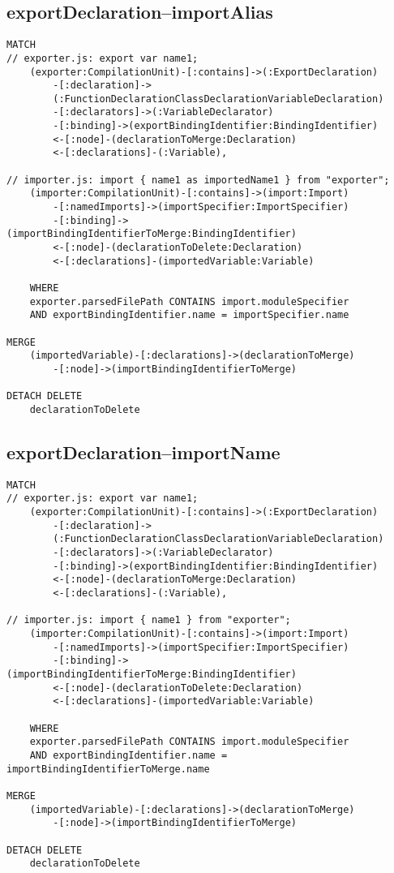 \newpage
\subsection{exportDeclaration–importAlias}
\begin{lstlisting}[language=Cypher]
MATCH
// exporter.js: export var name1;
    (exporter:CompilationUnit)-[:contains]->(:ExportDeclaration)
        -[:declaration]->
        (:FunctionDeclarationClassDeclarationVariableDeclaration)
        -[:declarators]->(:VariableDeclarator)
        -[:binding]->(exportBindingIdentifier:BindingIdentifier)
        <-[:node]-(declarationToMerge:Declaration)
        <-[:declarations]-(:Variable),

// importer.js: import { name1 as importedName1 } from "exporter";
    (importer:CompilationUnit)-[:contains]->(import:Import)
        -[:namedImports]->(importSpecifier:ImportSpecifier)
        -[:binding]->(importBindingIdentifierToMerge:BindingIdentifier)
        <-[:node]-(declarationToDelete:Declaration)
        <-[:declarations]-(importedVariable:Variable)

    WHERE
    exporter.parsedFilePath CONTAINS import.moduleSpecifier
    AND exportBindingIdentifier.name = importSpecifier.name

MERGE
    (importedVariable)-[:declarations]->(declarationToMerge)
        -[:node]->(importBindingIdentifierToMerge)

DETACH DELETE
    declarationToDelete
\end{lstlisting}


\newpage
\subsection{exportDeclaration–importName}
\begin{lstlisting}[language=Cypher]
MATCH
// exporter.js: export var name1;
    (exporter:CompilationUnit)-[:contains]->(:ExportDeclaration)
        -[:declaration]->
        (:FunctionDeclarationClassDeclarationVariableDeclaration)
        -[:declarators]->(:VariableDeclarator)
        -[:binding]->(exportBindingIdentifier:BindingIdentifier)
        <-[:node]-(declarationToMerge:Declaration)
        <-[:declarations]-(:Variable),

// importer.js: import { name1 } from "exporter";
    (importer:CompilationUnit)-[:contains]->(import:Import)
        -[:namedImports]->(importSpecifier:ImportSpecifier)
        -[:binding]->(importBindingIdentifierToMerge:BindingIdentifier)
        <-[:node]-(declarationToDelete:Declaration)
        <-[:declarations]-(importedVariable:Variable)

    WHERE
    exporter.parsedFilePath CONTAINS import.moduleSpecifier
    AND exportBindingIdentifier.name = importBindingIdentifierToMerge.name

MERGE
    (importedVariable)-[:declarations]->(declarationToMerge)
        -[:node]->(importBindingIdentifierToMerge)

DETACH DELETE
    declarationToDelete
\end{lstlisting}



